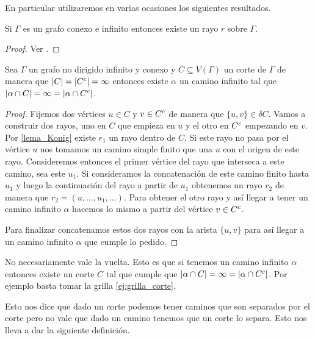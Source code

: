 \documentclass[tesis.tex]{subfiles}
\begin{document}
En particular utilizaremos en varias ocasiones los siguientes resultados.


\begin{lema}[König]\label{lema_Konig}
	Si $\Gamma$ es un grafo conexo e infinito entonces existe un rayo $r$ sobre $\Gamma$.
\end{lema}
\begin{proof}
	Ver \cite[p.215]{diestel2005graph}.
\end{proof}


\begin{lema}\label{lema_camino_infinito_cortado}
	Sea $\Gamma$ un grafo no dirigido infinito y conexo y $C \subseteq V(\Gamma)$ un corte de $\Gamma$ de manera que $|C| = |C^{c}| = \infty$ entonces existe $\alpha$ un camino infinito tal que 
	$|\alpha \cap C| = \infty = |\alpha \cap C^{c}|$.
\end{lema}

\begin{proof}
	Fijemos dos vértices $u \in C$ y $v \in C^{c}$ de manera que $\{u,v\} \in \delta C$.
	Vamos a construir dos rayos, uno en $C$ que empieza en $u$ y el otro en $C^{c}$ empezando en $v$.
	Por \ref{lema_Konig} existe $r_{1}$ un rayo dentro de $C$.
	Si este rayo no pasa por el vértice $u$ nos tomamos un camino simple finito que una $u$ con el origen de este rayo.
	Consideremos entonces el primer vértice del rayo que interseca a este camino, sea este $u_{1}$.
	Si consideramos la concatenación de este camino finito hasta $u_{1}$ y luego la continuación del rayo a partir de $u_{1}$ obtenemos 
	un rayo $r_{2}$ de manera que $r_{2} = (u, \dots, u_{1}, \dots)$.
	Para obtener el otro rayo y así llegar a tener un camino infinito $\alpha$ hacemos lo mismo a partir del vértice $v \in C^{c}$. 
	
	Para finalizar concatenamos estos dos rayos con la arista $\{u,v\}$ para así llegar a un camino infinito $\alpha$ que cumple lo pedido. 
	
\end{proof}


No necesariamente vale la vuelta.
Esto es que si tenemos un camino infinito $\alpha$ entonces existe un corte $C$ tal que cumple que $|\alpha \cap C| = \infty = |\alpha \cap C^{c}|$.
Por ejemplo basta tomar la grilla \ref{ej:grilla_corte}.

Esto nos dice que dado un corte podemos tener caminos que son separados por el corte pero no vale que dado un camino tenemos que un corte lo separa.
Esto nos lleva a dar la siguiente definición.
\end{document}
